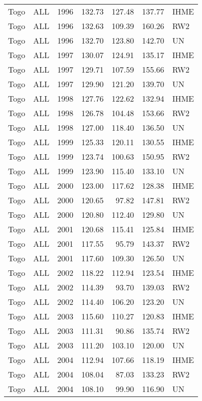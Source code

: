 \begin{longtable}{lllrrrl}
  Togo & ALL & 1996 & 132.73 & 127.48 & 137.77 & IHME \\ 
  Togo & ALL & 1996 & 132.63 & 109.39 & 160.26 & RW2 \\ 
  Togo & ALL & 1996 & 132.70 & 123.80 & 142.70 & UN \\ 
  Togo & ALL & 1997 & 130.07 & 124.91 & 135.17 & IHME \\ 
  Togo & ALL & 1997 & 129.71 & 107.59 & 155.66 & RW2 \\ 
  Togo & ALL & 1997 & 129.90 & 121.20 & 139.70 & UN \\ 
  Togo & ALL & 1998 & 127.76 & 122.62 & 132.94 & IHME \\ 
  Togo & ALL & 1998 & 126.78 & 104.48 & 153.66 & RW2 \\ 
  Togo & ALL & 1998 & 127.00 & 118.40 & 136.50 & UN \\ 
  Togo & ALL & 1999 & 125.33 & 120.11 & 130.55 & IHME \\ 
  Togo & ALL & 1999 & 123.74 & 100.63 & 150.95 & RW2 \\ 
  Togo & ALL & 1999 & 123.90 & 115.40 & 133.10 & UN \\ 
  Togo & ALL & 2000 & 123.00 & 117.62 & 128.38 & IHME \\ 
  Togo & ALL & 2000 & 120.65 & 97.82 & 147.81 & RW2 \\ 
  Togo & ALL & 2000 & 120.80 & 112.40 & 129.80 & UN \\ 
  Togo & ALL & 2001 & 120.68 & 115.41 & 125.84 & IHME \\ 
  Togo & ALL & 2001 & 117.55 & 95.79 & 143.37 & RW2 \\ 
  Togo & ALL & 2001 & 117.60 & 109.30 & 126.50 & UN \\ 
  Togo & ALL & 2002 & 118.22 & 112.94 & 123.54 & IHME \\ 
  Togo & ALL & 2002 & 114.39 & 93.70 & 139.03 & RW2 \\ 
  Togo & ALL & 2002 & 114.40 & 106.20 & 123.20 & UN \\ 
  Togo & ALL & 2003 & 115.60 & 110.27 & 120.83 & IHME \\ 
  Togo & ALL & 2003 & 111.31 & 90.86 & 135.74 & RW2 \\ 
  Togo & ALL & 2003 & 111.20 & 103.10 & 120.00 & UN \\ 
  Togo & ALL & 2004 & 112.94 & 107.66 & 118.19 & IHME \\ 
  Togo & ALL & 2004 & 108.04 & 87.03 & 133.23 & RW2 \\ 
  Togo & ALL & 2004 & 108.10 & 99.90 & 116.90 & UN \\ 

\end{longtable}
